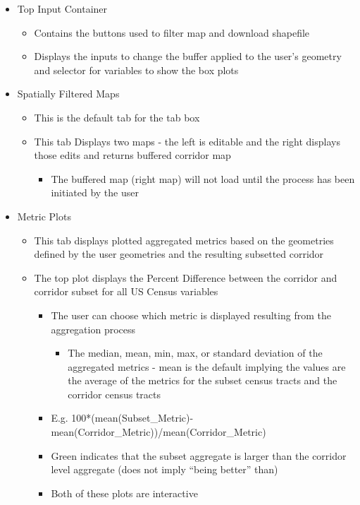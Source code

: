 \documentclass[
]{article}
\providecommand{\tightlist}{%
  \setlength{\itemsep}{0pt}\setlength{\parskip}{0pt}}
\begin{document}
\begin{itemize}
\tightlist
\item
  Top Input Container

  \begin{itemize}
  \tightlist
  \item
    Contains the buttons used to filter map and download shapefile
  \item
    Displays the inputs to change the buffer applied to the user's
    geometry and selector for variables to show the box plots
  \end{itemize}
\item
  Spatially Filtered Maps

  \begin{itemize}
  \tightlist
  \item
    This is the default tab for the tab box
  \item
    This tab Displays two maps - the left is editable and the right
    displays those edits and returns buffered corridor map

    \begin{itemize}
    \tightlist
    \item
      The buffered map (right map) will not load until the process has
      been initiated by the user
    \end{itemize}
  \end{itemize}
\item
  Metric Plots

  \begin{itemize}
  \tightlist
  \item
    This tab displays plotted aggregated metrics based on the geometries
    defined by the user geometries and the resulting subsetted corridor
  \item
    The top plot displays the Percent Difference between the corridor
    and corridor subset for all US Census variables

    \begin{itemize}
    \tightlist
    \item
      The user can choose which metric is displayed resulting from the
      aggregation process

      \begin{itemize}
      \tightlist
      \item
        The median, mean, min, max, or standard deviation of the
        aggregated metrics - mean is the default implying the values are
        the average of the metrics for the subset census tracts and the
        corridor census tracts
      \end{itemize}
    \item
      E.g.
      100*(mean(Subset\_Metric)-mean(Corridor\_Metric))/mean(Corridor\_Metric)
    \item
      Green indicates that the subset aggregate is larger than the
      corridor level aggregate (does not imply ``being better'' than)
    \item
      Both of these plots are interactive


\end{itemize}
\end{itemize}
\end{itemize}
\end{document}
